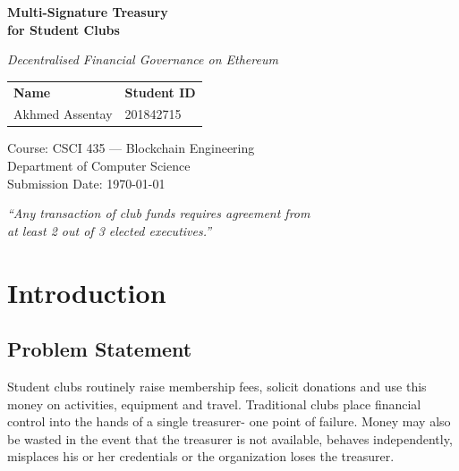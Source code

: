 \documentclass[12pt,a4paper]{article}
\begin{document}
\begin{titlepage}
  \centering
  \vspace*{1.5cm}
  {\Huge\bfseries Multi-Signature Treasury\\[0.4em]
   for Student Clubs\par}
  \vspace{0.8cm}
  {\large\itshape Decentralised Financial Governance on Ethereum\par}
  \vspace{1.8cm}
  {\large
    \begin{tabular}{ll}
      \textbf{Name} & \textbf{Student ID} \\[4pt]
      Akhmed Assentay & 201842715 \\
    \end{tabular}
  }
  \vspace{1.2cm}
  {\large
    Course: CSCI 435 — Blockchain Engineering \\[0.3em]
    Department of Computer Science \\[0.3em]
    Submission Date: \today
  }
  \vfill
  \begin{mdframed}[backgroundcolor=gray!10, linecolor=blue!40, linewidth=1pt,
                   innerleftmargin=12pt, innerrightmargin=12pt,
                   innertopmargin=8pt, innerbottommargin=8pt]
    \centering\itshape
    ``Any transaction of club funds requires agreement from\\
    at least 2 out of 3 elected executives.''
  \end{mdframed}
\end{titlepage}

\tableofcontents
\newpage

\section{Introduction}

\subsection{Problem Statement}

Student clubs routinely raise membership fees, solicit donations and use this money on activities, equipment and travel. Traditional clubs place financial control into the hands of a single treasurer- one point of failure. Money may also be wasted in the event that the treasurer is not available, behaves independently, misplaces his or her credentials or the organization loses the treasurer.
\end{document}
